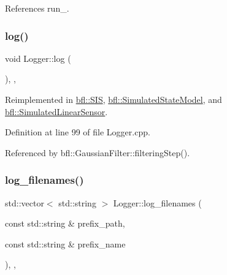 References run\+\_\+.

\mbox{\label{classbfl_1_1Logger_ad44f46593cb8c4c87c1178eb326e2f64}} 
\subsubsection{\texorpdfstring{log()}{log()}}
{\footnotesize\ttfamily void Logger\+::log (\begin{DoxyParamCaption}{ }\end{DoxyParamCaption})\hspace{0.3cm}{\ttfamily [protected]}, {\ttfamily [virtual]}, {\ttfamily [inherited]}}



Reimplemented in \mbox{\hyperlink{classbfl_1_1SIS_aeb0b87af1cc1fc4b616989ef489ecccc}{bfl\+::\+S\+IS}}, \mbox{\hyperlink{classbfl_1_1SimulatedStateModel_aa022eb0d50d898ffcc831af2907265b2}{bfl\+::\+Simulated\+State\+Model}}, and \mbox{\hyperlink{classbfl_1_1SimulatedLinearSensor_ab75bbe744d8516c97dfc90ad499b10e6}{bfl\+::\+Simulated\+Linear\+Sensor}}.



Definition at line 99 of file Logger.\+cpp.



Referenced by bfl\+::\+Gaussian\+Filter\+::filtering\+Step().

\mbox{\label{classbfl_1_1Logger_a328ceaa8e70e6918f11142b12b8be217}} 
\subsubsection{\texorpdfstring{log\+\_\+filenames()}{log\_filenames()}}
{\footnotesize\ttfamily std\+::vector$<$ std\+::string $>$ Logger\+::log\+\_\+filenames (\begin{DoxyParamCaption}\item[{const std\+::string \&}]{prefix\+\_\+path,  }\item[{const std\+::string \&}]{prefix\+\_\+name }\end{DoxyParamCaption})\hspace{0.3cm}{\ttfamily [protected]}, {\ttfamily [virtual]}, {\ttfamily [inherited]}}



